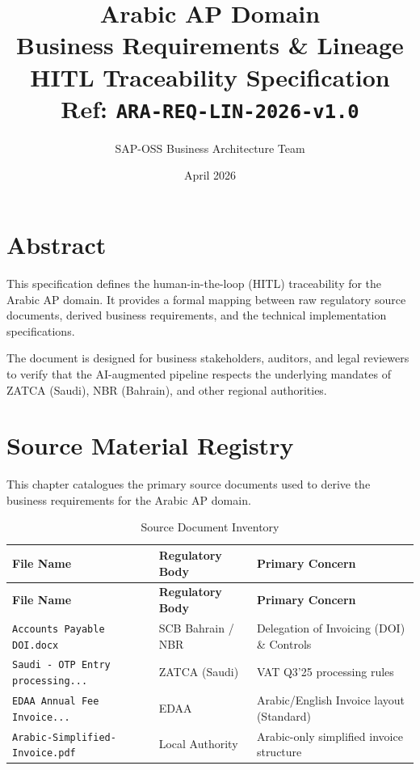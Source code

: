 \documentclass[11pt,a4paper,twoside]{report}
\begin{document}
\title{\Huge Arabic AP Domain \\
\textbf{Business Requirements \& Lineage} \\
\large HITL Traceability Specification \\
\small Ref: \texttt{ARA-REQ-LIN-2026-v1.0}}
\author{SAP-OSS Business Architecture Team}
\date{April 2026}

\maketitle


\chapter*{Abstract}

This specification defines the human-in-the-loop (HITL) traceability for the Arabic AP domain. It provides a formal mapping between raw regulatory source documents, derived business requirements, and the technical implementation specifications.

The document is designed for business stakeholders, auditors, and legal reviewers to verify that the AI-augmented pipeline respects the underlying mandates of ZATCA (Saudi), NBR (Bahrain), and other regional authorities.
\chapter{Source Material Registry}
\label{ch:source-registry}

This chapter catalogues the primary source documents used to derive the business requirements for the Arabic AP domain.

\begin{longtable}{p{5cm} p{3cm} p{6cm}}
\caption{Source Document Inventory} \\
\toprule
\textbf{File Name} & \textbf{Regulatory Body} & \textbf{Primary Concern} \\
\midrule
\endfirsthead
\toprule
\textbf{File Name} & \textbf{Regulatory Body} & \textbf{Primary Concern} \\
\midrule
\endhead
\texttt{Accounts Payable DOI.docx} & SCB Bahrain / NBR & Delegation of Invoicing (DOI) \& Controls \\
\texttt{Saudi - OTP Entry processing...} & ZATCA (Saudi) & VAT Q3'25 processing rules \\
\texttt{EDAA Annual Fee Invoice...} & EDAA & Arabic/English Invoice layout (Standard) \\
\texttt{Arabic-Simplified-Invoice.pdf} & Local Authority & Arabic-only simplified invoice structure \\
\bottomrule
\end{longtable}
\end{document}
